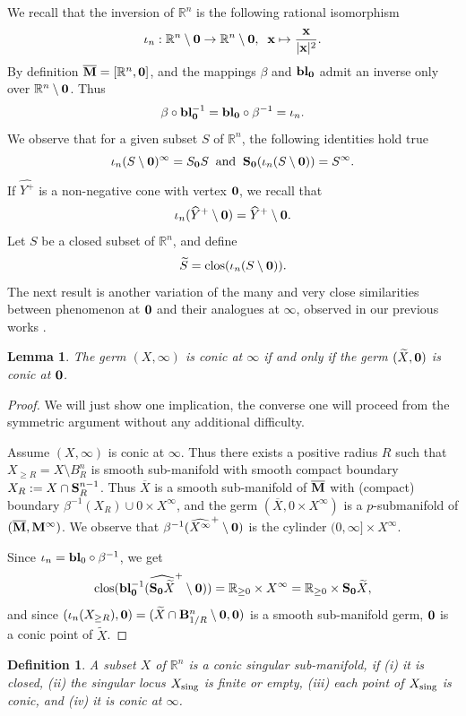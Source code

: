 \documentclass[11pt]{amsart}
\newtheorem{lemma}[theorem]{Lemma}
\newtheorem{definition}[theorem]{Definition}
\newcommand{\field}[1]{\mathbb{#1}}
\newcommand{\R}{\field{R}}
\newcommand{\wh}[1]{\widehat{#1}}
\newcommand{\wt}[1]{\widetilde{#1}}
\newcommand{\bbl}{{\bf bl}}
\newcommand{\bbo}{{\bf 0}}
\newcommand{\bB}{{\bf B}}
\newcommand{\bM}{{\bf M}}
\newcommand{\bMbar}{\overline{\bf M}}
\newcommand{\bS}{{\bf S}}
\newcommand{\bx}{{\bf x}}
\newcommand{\clos}{{\rm clos}}
\newcommand{\gR}{{\geq R}}
\newcommand{\ovX}{{\overline{X}}}
\newcommand{\Rgo}{{\R_{\geq 0}}}
\newcommand{\Rn}{{\R^n}}
\newcommand{\sing}{{\rm sing}}
\numberwithin{equation}{section}
\numberwithin{equation}{section}
\begin{document}
	\smallskip
	We recall that the inversion of $\Rn$ is the following rational isomorphism 
	$$
	\iota_n: \Rn\setminus\bbo \to \Rn\setminus\bbo, \;\; 
	\bx \mapsto \frac{\bx}{|\bx|^2}.
	$$
By definition $\bMbar = [\Rn,\bbo]$, and the mappings $\beta$ and $\bbl_\bbo$ admit an inverse only over $\Rn\setminus\bbo$. Thus
	$$
	\beta \circ \bbl_\bbo^{-1} = \bbl_\bbo\circ\beta^{-1} = \iota_n. 
	$$ 
	We observe that for a given subset $S$ of $\Rn$, the following identities hold
	true
	$$
	\iota_n(S\setminus \bbo)^\infty = S_\bbo S \;\; {\rm and} \;\;
	\bS_\bbo (\iota_n(S\setminus \bbo)) = S^\infty.
	$$
	If $\wh{Y^+}$ is a non-negative cone with vertex $\bbo$, we recall that
	$$
	\iota_n (\wh{Y}^+\setminus \bbo) = \wh{Y}^+\setminus \bbo.
	$$ 
	Let $S$ be a closed subset of $\Rn$, and define
	$$
	\wt{S} = \clos(\iota_n(S\setminus \bbo)).
	$$
	The next result is another variation of the many and very close similarities 
	between phenomenon at $\bbo$ and their analogues at $\infty$, 
	observed in our previous works \cite{CoGrMi1,CoGrMi2}.
	\begin{lemma}\label{lem:conic-inversion}
		The germ $(X,\infty)$ is conic at $\infty$ if and only if the 
		germ $(\wt{X},\bbo)$ is conic at $\bbo$.
	\end{lemma}
	\begin{proof}
		We will just show one implication, the converse one will proceed from 
		the symmetric argument without any additional difficulty.
		
		\medskip
		Assume $(X,\infty)$ is conic at $\infty$. Thus there exists a positive
		radius $R$ such that $X_\gR = X\setminus B_R^n$ is smooth sub-manifold with smooth compact boundary $X_R := X\cap \bS_R^{n-1}$. Thus 
		$\ovX$ is a smooth sub-manifold of $\bMbar$ with (compact) boundary 
		$\beta^{-1}(X_R) \cup 0\times X^\infty$, and the germ $(\ovX,0\times X^\infty)$ is a $p$-submanifold of $(\bMbar,\bM^\infty)$. We observe that $\beta^{-1}(\wh{X^\infty}^+\setminus \bbo)$ is the cylinder 
		$(0,\infty] \times X^\infty$.
		
		\medskip
		Since $\iota_n = \bbl_0 \circ\beta^{-1}$, we get 
		$$
		\clos(\bbl_\bbo^{-1}(\wh{\bS_\bbo\wt{X}}^+\setminus\bbo)) = \Rgo \times 
		X^\infty = \Rgo \times \bS_\bbo\wt{X},
		$$
		and since $(\iota_n(X_\gR),\bbo) = (\wt{X}\cap \bB_{1/R}^n \setminus\bbo,\bbo)$ is a smooth sub-manifold germ, $\bbo$ is a conic point of $\wt{X}$.
	\end{proof}
	
	\begin{definition}\label{def:conic-Rn}
		A subset $X$ of $\Rn$ is a \em conic singular sub-manifold, \em if (i) it is closed,  (ii) the singular locus $X_\sing$ is finite or empty, (iii) each point of $X_\sing$ is conic, and  (iv) it is conic at $\infty$.
	\end{definition}
	
\end{document}
